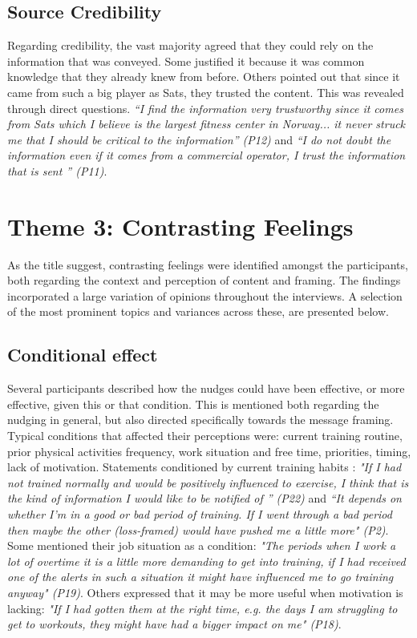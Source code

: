 \subsection{Source Credibility}
Regarding credibility, the vast majority agreed that they could rely on the information that was conveyed. Some justified it because it was common knowledge that they already knew from before. Others pointed out that since it came from such a big player as Sats, they trusted the content. This was revealed through direct questions. \textit{“I find the information very trustworthy since it comes from Sats which I believe is the largest fitness center in Norway... it never struck me that I should be critical to the information” (P12)} and \textit{“I do not doubt the information even if it comes from a commercial operator, I trust the information that is sent ” (P11)}.

\section{Theme 3: Contrasting Feelings}
As the title suggest, contrasting feelings were identified amongst the participants, both regarding the context and perception of content and framing. The findings incorporated a large variation of opinions throughout the interviews. A selection of the most prominent topics and variances across these, are presented below. 

\subsection{Conditional effect}
Several participants described how the nudges could have been effective, or more effective, given this or that condition. This is mentioned both regarding the nudging in general, but also directed specifically towards the message framing. Typical conditions that affected their perceptions were: current training routine, prior physical activities frequency, work situation and free time, priorities, timing, lack of motivation. Statements conditioned by current training habits : \textit{"If I had not trained normally and would be positively influenced to exercise, I think that is the kind of information I would like to be notified of ” (P22)} and \textit{“It depends on whether I'm in a good or bad period of training. If I went through a bad period then maybe the other (loss-framed) would have pushed me a little more" (P2)}. Some mentioned their job situation as a condition: \textit{"The periods when I work a lot of overtime it is a little more demanding to get into training, if I had received one of the alerts in such a situation it might have influenced me to go  training anyway" (P19)}. Others expressed that it may be more useful when motivation is lacking: \textit{"If I had gotten them at the right time, e.g. the days I am struggling to get to workouts, they might have had a bigger impact on me" (P18)}.

